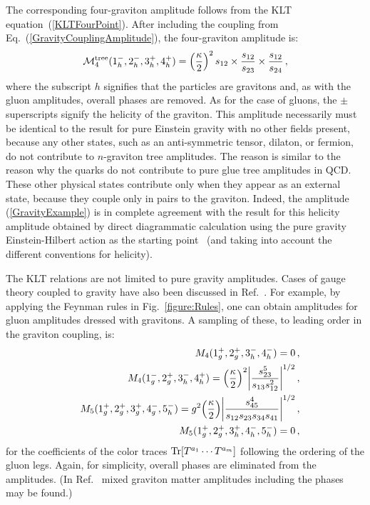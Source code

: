 \documentclass[12pt]{livrev}
\begin{document}
The corresponding four-graviton amplitude follows 
from the KLT equation~(\ref{KLTFourPoint}).  After including the
coupling from Eq.~(\ref{GravityCouplingAmplitude}), the four-graviton
amplitude is:
%
\begin{equation}
{\cal M}_4^{\rm tree} (1^-_h, 2^-_h, 3^+_h, 4^+_h) = 
\left({\kappa \over 2} \right)^{2}  s_{12} \times  {s_{12} \over s_{23}}
\times  {s_{12} \over s_{24}} \,,
\label{GravityExample}
\end{equation}
%
where the subscript $h$ signifies that the particles are gravitons and,
as with the gluon amplitudes, overall phases are removed. As for the
case of gluons, the $\pm$ superscripts signify the helicity of the
graviton. This amplitude necessarily must be identical to the result
for pure Einstein gravity with no other fields present, because any
other states, such as an anti-symmetric tensor, dilaton, or fermion, do
not contribute to $n$-graviton tree amplitudes. The reason is similar
to the reason why the quarks do not contribute to pure glue tree amplitudes in
QCD. These other physical states contribute only when they appear as
an external state, because they couple only in pairs to the graviton.
Indeed, the amplitude (\ref{GravityExample}) is in complete agreement
with the result for this helicity amplitude obtained by direct
diagrammatic calculation using the pure gravity Einstein-Hilbert
action as the starting point~\cite{Berends74} (and taking into account the
different conventions for helicity).

The KLT relations are not limited to pure gravity
amplitudes.  Cases of gauge theory coupled to gravity have
also been discussed in Ref.~\cite{Square}.
For example, by applying the Feynman rules in Fig.~\ref{figure:Rules}, 
one can obtain amplitudes for gluon amplitudes dressed with gravitons.
A sampling of these, to leading order in the graviton coupling, 
is:
%
\begin{eqnarray}
&& M_4(1_g^+,2_g^+, 3_h^-, 4_h^-) =  0\,, \nonumber \\
%
&& M_4(1_g^-, 2_g^+, 3_h^-, 4_h^+) =  \Bigl({\kappa\over 2} \Bigr)^2
        \biggl| {s_{23}^5
                     \over s_{13} s_{12}^2} \biggr|^{1/2} \,, \nonumber\\
%
&&M_5(1_g^+, 2_g^+, 3_g^+, 4_g^-, 5_h^-) =  g^2 \Bigl({\kappa\over 2} \Bigr)
   \biggl| {s_{45}^4 \over s_{12} s_{23} s_{34} s_{41} } 
    \biggr|^{1/2}\,, \nonumber \\
%
&&M_5(1_g^+, 2_g^+, 3_h^+, 4_h^-, 5_h^-) = 0 \,, \nonumber \\
\end{eqnarray}
%
for the coefficients of the color traces ${\rm Tr} [T^{a_1} \cdots
T^{a_m}]$ following the ordering of the gluon legs.  Again, for
simplicity, overall phases are eliminated from the amplitudes.  (In
Ref.~\cite{Square} mixed graviton matter amplitudes including the
phases may be found.)
\end{document}
